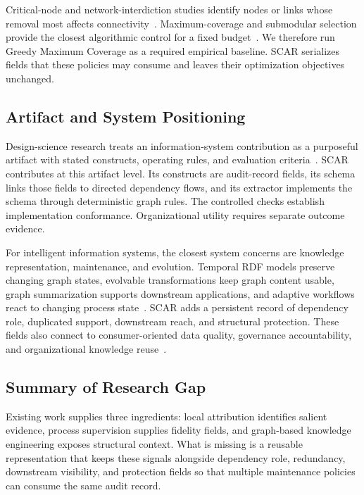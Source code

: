 \documentclass[pdflatex,sn-basic]{sn-jnl}
\begin{document}
Critical-node and network-interdiction studies identify nodes or links whose removal most affects connectivity~\citep{borgatti2006keyplayer,israeli2002interdiction}. Maximum-coverage and submodular selection provide the closest algorithmic control for a fixed budget~\citep{khuller1999budgeted,nemhauser1978analysis}. We therefore run Greedy Maximum Coverage as a required empirical baseline. SCAR serializes fields that these policies may consume and leaves their optimization objectives unchanged.

\subsection{Artifact and System Positioning}

Design-science research treats an information-system contribution as a purposeful artifact with stated constructs, operating rules, and evaluation criteria~\citep{gregor2013positioning,hevner2004design}. SCAR contributes at this artifact level. Its constructs are audit-record fields, its schema links those fields to directed dependency flows, and its extractor implements the schema through deterministic graph rules. The controlled checks establish implementation conformance. Organizational utility requires separate outcome evidence.

For intelligent information systems, the closest system concerns are knowledge representation, maintenance, and evolution. Temporal RDF models preserve changing graph states, evolvable transformations keep graph content usable, graph summarization supports downstream applications, and adaptive workflows react to changing process state~\citep{ma2023temporalrdf,malburg2023mapek,sacenti2021kgsummarization,slifka2023evolvable}. SCAR adds a persistent record of dependency role, duplicated support, downstream reach, and structural protection. These fields also connect to consumer-oriented data quality, governance accountability, and organizational knowledge reuse~\citep{abraham2019data,alavi2001review,wang1996beyond}.

\subsection{Summary of Research Gap}

Existing work supplies three ingredients: local attribution identifies salient evidence, process supervision supplies fidelity fields, and graph-based knowledge engineering exposes structural context. What is missing is a reusable representation that keeps these signals alongside dependency role, redundancy, downstream visibility, and protection fields so that multiple maintenance policies can consume the same audit record.
\end{document}
